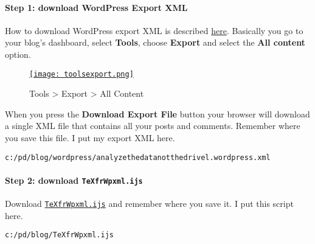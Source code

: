\paragraph{Step 1: download WordPress Export XML}

How to download WordPress export XML is described
\href{http://en.blog.wordpress.com/2006/06/12/xml-import-export/}{here}.
Basically you go to your blog's dashboard, select \textbf{Tools}, choose
\textbf{Export} and select the \textbf{All content} option.


\captionsetup[figure]{labelformat=empty}
\begin{figure}[htbp]
\centering
\href{http://bakerjd99.files.wordpress.com/2012/02/toolsexport.png}{\texttt{[image: toolsexport.png]}}
\caption{Tools \textgreater{} Export \textgreater{} All  Content}
\label{fig:2518X1}
\end{figure}

When you press the \textbf{Download Export File} button your browser
will download a single XML file that contains all your posts and
comments. Remember where you save this file. I put my export XML here.
\begin{tcolorbox}[breakable, size=fbox, boxrule=1pt, pad at break*=1mm,colback=cellbackground, colframe=cellborder]
\begin{verbatim}
c:/pd/blog/wordpress/analyzethedatanotthedrivel.wordpress.xml
\end{verbatim}
\end{tcolorbox}

\paragraph{Step 2: download \texttt{TeXfrWpxml.ijs}}

Download
\href{https://github.com/bakerjd99/jacks/blob/master/texfrwpxml/TeXfrWpxml.ijs}{\texttt{TeXfrWpxml.ijs}}
and remember where you save it. I put this script here.

\begin{tcolorbox}[breakable, size=fbox, boxrule=1pt, pad at break*=1mm,colback=cellbackground, colframe=cellborder]
\begin{verbatim}
c:/pd/blog/TeXfrWpxml.ijs
\end{verbatim}
\end{tcolorbox}

